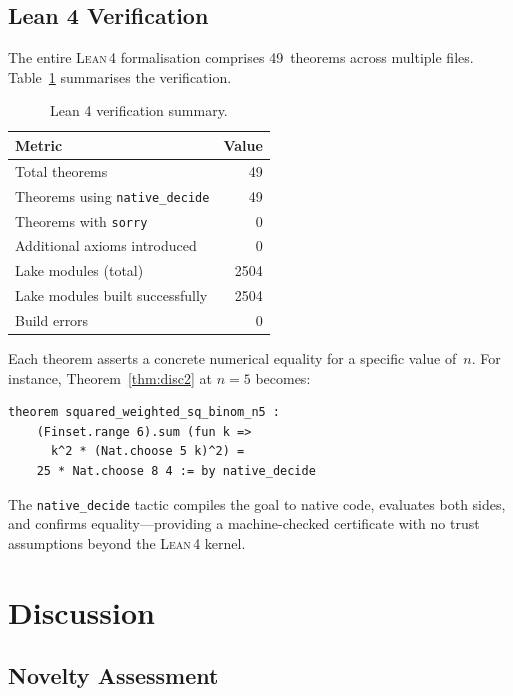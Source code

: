 \documentclass[11pt,a4paper]{article}
\theoremstyle{definition}
\theoremstyle{remark}
\newcommand{\lean}{\textsc{Lean\,4}}
\newcommand{\sorry}{\texttt{sorry}}
\begin{document}
\subsection{Lean 4 Verification}\label{sec:lean-results}

The entire \lean{} formalisation comprises 49~theorems across
multiple files.  Table~\ref{tab:lean} summarises the verification.

\begin{table}[ht]
\centering
\caption{Lean 4 verification summary.}\label{tab:lean}
\begin{tabular}{@{}lr@{}}
\toprule
\textbf{Metric} & \textbf{Value} \\
\midrule
Total theorems & 49 \\
Theorems using \texttt{native\_decide} & 49 \\
Theorems with \sorry{} & 0 \\
Additional axioms introduced & 0 \\
Lake modules (total) & 2504 \\
Lake modules built successfully & 2504 \\
Build errors & 0 \\
\bottomrule
\end{tabular}
\end{table}

Each theorem asserts a concrete numerical equality for a specific
value of~$n$.  For instance, Theorem~\ref{thm:disc2} at $n=5$
becomes:
\begin{verbatim}
theorem squared_weighted_sq_binom_n5 :
    (Finset.range 6).sum (fun k =>
      k^2 * (Nat.choose 5 k)^2) =
    25 * Nat.choose 8 4 := by native_decide
\end{verbatim}

The \texttt{native\_decide} tactic compiles the goal to native code,
evaluates both sides, and confirms equality---providing a
machine-checked certificate with no trust assumptions beyond
the \lean{} kernel.


\section{Discussion}\label{sec:discussion}

\subsection{Novelty Assessment}\label{sec:novelty}
\end{document}
